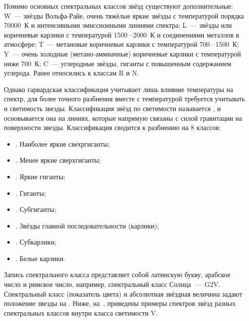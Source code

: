 Помимо основных спектральных классов звёзд существуют дополнительные: W~--- звёзды Вольфа-Райе, очень тяжёлые яркие звёзды с температурой порядка 70000~К и интенсивными эмиссионными линиями спектра; L~--- звёзды или коричневые карлики с температурой 1500\,--\,2000~К и соединениями металлов в атмосфере; T~--- метановые коричневые карлики с температурой 700\,--\,1500~К; Y~--- очень холодные (метано-аммиачные) коричневые карлики с температурой ниже 700~К; C~--- углеродные звёзды, гиганты с повышенным содержанием углерода. Ранее относились к классам R и N.

Однако гарвардская классификация учитывает лишь влияние температуры на спектр, для более точного разбиения вместе с температурой требуется учитывать и светимость звезды. Классификация звёзд по светимости называется , и основывается она на линиях, которые напрямую связаны с силой гравитации на поверхности звезды. Классификация сводится к разбиению на 8 классов:
\begin{itemize}
	\item {}. Наиболее яркие свехргиганты;
	\item {}. Менее яркие сверхгиганты;
	\item {}. Яркие гиганты;
	\item {}. Гиганты;
	\item {}. Субгиганты;
	\item {}. Звёзды главной последовательности (карлики);
	\item {}. Субкарлики;
	\item {}. Белые карлики.
\end{itemize}
Запись спектрального класса представляет собой латинскую букву, арабское число и римское число, например, спектральный класс Солнца~---~G2V. Спектральный класс (показатель цвета) и абсолютная звёздная величина задают положение звезды на . Ниже, на~, приведены примеры спектров звёзд разных спектральных классов внутри класса светимости V.
